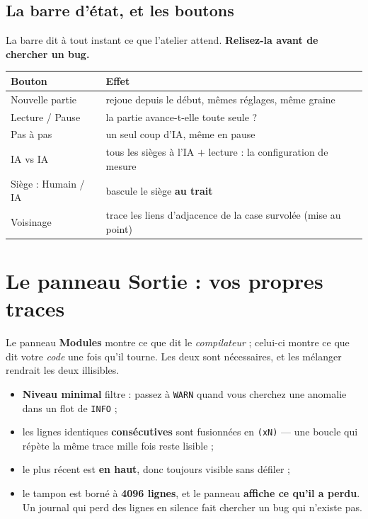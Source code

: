 \subsection{La barre d'état, et les boutons}

La barre dit à tout instant ce que l'atelier attend. \textbf{Relisez-la avant de
chercher un bug.}

\begin{center}
\begin{tabular}{@{}p{4.2cm}p{9.6cm}@{}}
\toprule
\textbf{Bouton} & \textbf{Effet} \\
\midrule
Nouvelle partie & rejoue depuis le début, mêmes réglages, même graine \\
Lecture / Pause & la partie avance-t-elle toute seule ? \\
Pas à pas & un seul coup d'IA, même en pause \\
IA vs IA & tous les sièges à l'IA $+$ lecture : la configuration de mesure \\
Siège : Humain / IA & bascule le siège \textbf{au trait} \\
Voisinage & trace les liens d'adjacence de la case survolée (mise au point) \\
\bottomrule
\end{tabular}
\end{center}

\section{Le panneau Sortie : vos propres traces}

Le panneau \textbf{Modules} montre ce que dit le \emph{compilateur} ; celui-ci
montre ce que dit votre \emph{code} une fois qu'il tourne. Les deux sont
nécessaires, et les mélanger rendrait les deux illisibles.

\begin{itemize}
  \item \textbf{Niveau minimal} filtre : passez à \texttt{WARN} quand vous
        cherchez une anomalie dans un flot de \texttt{INFO} ;
  \item les lignes identiques \textbf{consécutives} sont fusionnées en
        \texttt{(xN)} — une boucle qui répète la même trace mille fois reste
        lisible ;
  \item le plus récent est \textbf{en haut}, donc toujours visible sans défiler ;
  \item le tampon est borné à \textbf{4096 lignes}, et le panneau \textbf{affiche
        ce qu'il a perdu}. Un journal qui perd des lignes en silence fait chercher
        un bug qui n'existe pas.
\end{itemize}

